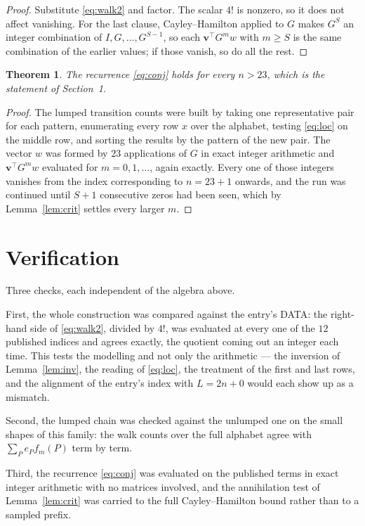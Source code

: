 \documentclass[11pt,a4paper]{article}
\theoremstyle{plain}
\newtheorem{theorem}{Theorem}
\theoremstyle{definition}
\begin{document}
\begin{proof}
Substitute \eqref{eq:walk2} and factor. The scalar $4!$ is nonzero, so it does not
affect vanishing. For the last clause, Cayley--Hamilton applied to $G$ makes $G^{S}$ an
integer combination of $I,G,\dots,G^{S-1}$, so each $\mathbf{v}^{\!\top}G^{m}w$ with
$m\ge S$ is the same combination of the earlier values; if those vanish, so do all the rest.
\end{proof}

\begin{theorem}
The recurrence \eqref{eq:conj} holds for every $n>23$, which is the statement of
Section~1.
\end{theorem}

\begin{proof}
The lumped transition counts were built by taking one representative pair for each pattern,
enumerating every row $x$ over the alphabet, testing \eqref{eq:loc} on the middle
row, and sorting the results by the pattern of the new pair. The vector $w$ was formed by
$23$ applications of $G$ in exact integer arithmetic and $\mathbf{v}^{\!\top}G^{m}w$
evaluated for $m=0,1,\dots$, again exactly. Every one of those integers vanishes from the
index corresponding to $n=23+1$ onwards, and the run was continued until $S+1$
consecutive zeros had been seen, which by Lemma~\ref{lem:crit} settles every larger $m$.
\end{proof}

\section{Verification}

Three checks, each independent of the algebra above.

First, the whole construction was compared against the entry's DATA: the right-hand side of
\eqref{eq:walk2}, divided by $4!$, was evaluated at every one of the $12$
published indices and agrees exactly, the quotient coming out an integer each time. This
tests the modelling and not only the arithmetic --- the inversion of Lemma~\ref{lem:inv},
the reading of \eqref{eq:loc}, the treatment of the first and last rows, and the
alignment of the entry's index with $L=2n+0$ would each show up as a mismatch.

Second, the lumped chain was checked against the unlumped one on the small shapes of this
family: the walk counts over the full alphabet agree with $\sum_P e_Pf_m(P)$ term by term.

Third, the recurrence \eqref{eq:conj} was evaluated on the published terms in exact integer
arithmetic with no matrices involved, and the annihilation test of Lemma~\ref{lem:crit} was
carried to the full Cayley--Hamilton bound rather than to a sampled prefix.
\end{document}

